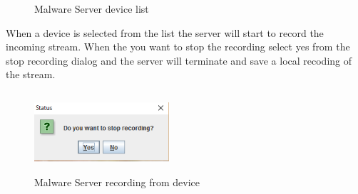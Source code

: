 \documentclass{article}
\begin{document}
\begin{itemize}
{\begin{figure}[H]
\caption{Malware Server device list}
\label{fig:my_label9}
\end{figure}
When a device is selected from the list the server will start to record the incoming stream. When the you want to stop the recording select yes from the stop recording dialog and the server will terminate and save a local recoding of the stream.
\begin{figure}[H]
\center
\includegraphics[width=5cm, height=3cm]{MalwareScreenshots/stopRec}
\caption{Malware Server recording from device}
\label{fig:my_label10}
\end{figure}}
\end{itemize}
\end{document}
